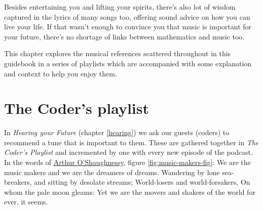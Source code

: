 \documentclass[
]{book}
\begin{document}
Besides entertaining you and lifting your spirits, there's also lot of wisdom captured in the lyrics of many songs too, offering sound advice on how you can live your life. If that wasn't enough to convince you that music is important for your future, there's no shortage of links between mathematics and music too. \citep{behindthemusic, musicnmaths}

This chapter explores the musical references scattered throughout in this guidebook in a series of playlists which are accompanied with some explanation and context to help you enjoy them.

\hypertarget{coders}{%
\section{The Coder's playlist}\label{coders}}

In \emph{Hearing your Future} (chapter \ref{hearing}) we ask our guests (coders) to recommend a tune that is important to them. These are gathered together in \emph{The Coder's Playlist} and incremented by one with every new episode of the podcast. In the words of \href{https://en.wikipedia.org/wiki/Arthur_O\%27Shaughnessy}{Arthur O'Shaughnessy}, figure \ref{fig:music-makers-fig}: We are the music makers and we are the dreamers of dreams. Wandering by lone sea-breakers, and sitting by desolate streams; World-losers and world-forsakers, On whom the pale moon gleams: Yet we are the movers and shakers of the world for ever, it seems.
\end{document}
